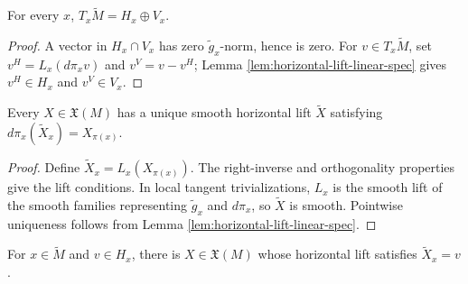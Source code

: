 \begin{lemma}
\label{lem:tangent-space-horizontal-vertical-splitting}





For every $x$, $T_x\tilde M=H_x\oplus V_x$.
\end{lemma}

\begin{proof}

\sketch A vector in $H_x\cap V_x$ has zero $\tilde g_x$-norm, hence is zero. For $v\in T_x\tilde M$, set $v^H=L_x(d\pi_xv)$ and $v^V=v-v^H$; Lemma \ref{lem:horizontal-lift-linear-spec} gives $v^H\in H_x$ and $v^V\in V_x$.
\end{proof}

\begin{proposition}
\label{prop:horizontal-lift-of-vector-field}





Every $X\in\mathfrak X(M)$ has a unique smooth horizontal lift $\tilde X$ satisfying $d\pi_x(\tilde X_x)=X_{\pi(x)}$.
\end{proposition}

\begin{proof}

\sketch Define $\tilde X_x=L_x(X_{\pi(x)})$. The right-inverse and orthogonality properties give the lift conditions. In local tangent trivializations, $L_x$ is the smooth lift of the smooth families representing $\tilde g_x$ and $d\pi_x$, so $\tilde X$ is smooth. Pointwise uniqueness follows from Lemma \ref{lem:horizontal-lift-linear-spec}.
\end{proof}

\begin{proposition}
\label{prop:horizontal-lift-realizes-horizontal-vector}





For $x\in\tilde M$ and $v\in H_x$, there is $X\in\mathfrak X(M)$ whose horizontal lift satisfies $\tilde X_x=v$.
\end{proposition}

